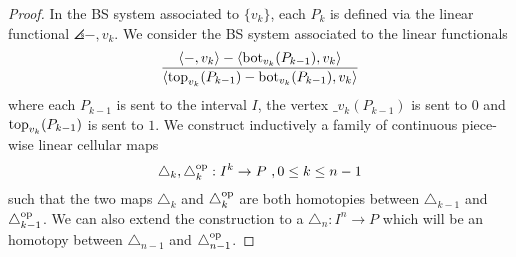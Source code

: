 \begin{proof}
    In the BS system associated to $\{v_k\}$, each $P_k$ is defined via the linear functional $\angles{-,v_k}$. 
    We consider the BS system associated to the linear functionals
    \begin{equation} \label{eq:new-projection}
    \frac{\langle-,v_k\rangle-\langle\operatorname{bot}_{v_k}(P_{k-1}),v_k\rangle}{\langle\operatorname{top}_{v_k}(P_{k-1})-\operatorname{bot}_{v_k}(P_{k-1}),v_k\rangle}
    \end{equation}
    where each $P_{k-1}$ is sent to the interval $I$, the vertex $\bm_{v_k}(P_{k-1})$ is sent to $0$ and $\operatorname{top}_{v_k}(P_{k-1})$ is sent to $1$. 
    We construct inductively a family of continuous piece-wise linear cellular maps 
    \[
    \triangle_k, \triangle_k^{\mathrm{op}}: I^k \to P \ , 0 \leq k \leq n-1
    \]
    such that the two maps $\triangle_k$ and $\triangle_k^{\mathrm{op}}$ are both homotopies between $\triangle_{k-1}$ and $\triangle_{k-1}^{\mathrm{op}}$.
    We can also extend the construction to a $\triangle_n : I^n \to P$ which will be an homotopy between $\triangle_{n-1}$ and $\triangle_{n-1}^{\mathrm{op}}$.


\end{proof}
